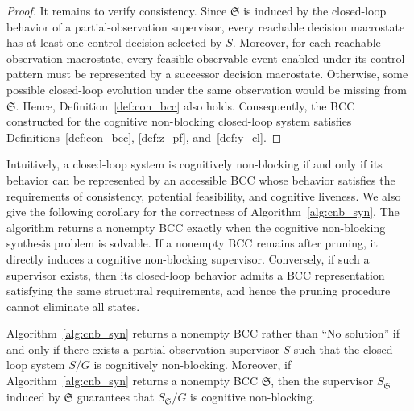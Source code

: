 \documentclass[final,5p,times,twocolumn,authoryear]{elsarticle}
\begin{document}
\begin{proof}
It remains to verify consistency. 
Since ${\mathfrak{S}}$ is induced by the closed-loop behavior of a partial-observation supervisor, every reachable decision macrostate has at least one control decision selected by $S$. 
Moreover, for each reachable observation macrostate, every feasible observable event enabled under its control pattern must be represented by a successor decision macrostate.
Otherwise, some possible closed-loop evolution under the same observation would be missing from $\mathfrak{S}$. 
Hence, Definition~\ref{def:con_bcc} also holds.
%
Consequently, the BCC constructed for the cognitive non-blocking closed-loop system satisfies Definitions~\ref{def:con_bcc}, \ref{def:z_pf}, and~\ref{def:y_cl}.
\end{proof}

Intuitively, a closed-loop system is cognitively non-blocking if and only if its behavior can be represented by an accessible BCC whose behavior satisfies the requirements of consistency, potential feasibility, and cognitive liveness.
%
We also give the following corollary for the correctness of Algorithm~\ref{alg:cnb_syn}.
The algorithm returns a nonempty BCC exactly when the cognitive non-blocking synthesis problem is solvable. 
If a nonempty BCC remains after pruning, it directly induces a cognitive non-blocking supervisor. 
Conversely, if such a supervisor exists, then its closed-loop behavior admits a BCC representation satisfying the same structural requirements, and hence the pruning procedure cannot eliminate all states.

\begin{corollary}\label{cor:alg_cnb_sound}
Algorithm~\ref{alg:cnb_syn} returns a nonempty BCC rather than ``No solution'' if and only if there exists a partial-observation supervisor $S$ such that the closed-loop system $S/G$ is cognitively non-blocking.
%
Moreover, if Algorithm~\ref{alg:cnb_syn} returns a nonempty BCC $\mathfrak{S}$, then the supervisor $S_{\mathfrak{S}}$ induced by $\mathfrak{S}$ guarantees that $S_{\mathfrak{S}}/G$ is cognitive non-blocking.
\end{corollary}

\end{document}
